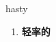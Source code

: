 
\begin{frame}
{\huge hasty}
\begin{center}
\begin{enumerate}\Large
  \item \textbf{轻率的}
\end{enumerate}
\end{center}
\end{frame}
